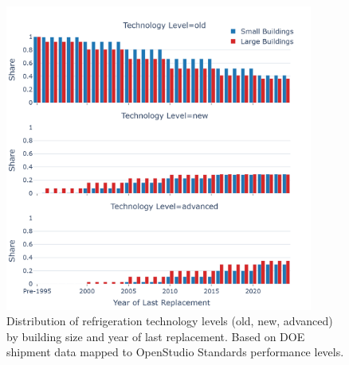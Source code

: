 \begin{figure}
    \centering
    \includegraphics[width=0.9\textwidth]{figures/refrigeration_tech_distribution.png}
    \caption{Distribution of refrigeration technology levels (old, new, advanced) by building size and year of last replacement. Based on DOE shipment data mapped to OpenStudio Standards performance levels.}
    \label{fig:refrigeration_tech_distribution}
\end{figure}
